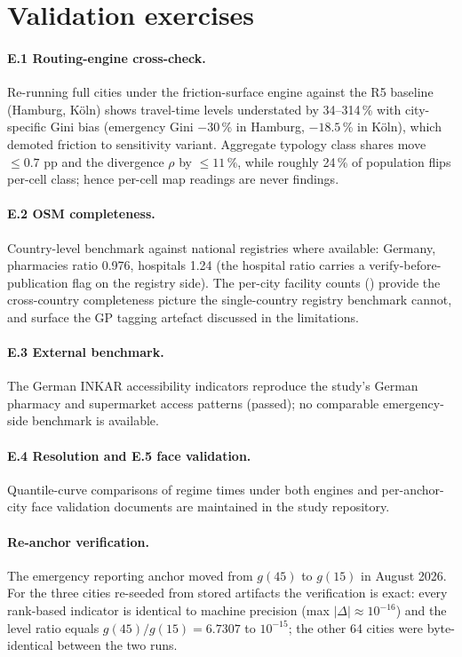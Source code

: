 \documentclass[11pt]{article}
\newcommand{\gref}{g(15)}          %
\begin{document}
\section{Validation exercises}\label{si:validation}

\paragraph{E.1 Routing-engine cross-check.} Re-running full cities under
the friction-surface engine against the R5 baseline (Hamburg, K\"oln)
shows travel-time levels understated by 34--314\,\% with city-specific
Gini bias (emergency Gini $-30$\,\% in Hamburg, $-18.5$\,\% in K\"oln),
which demoted friction to sensitivity variant. Aggregate typology class
shares move $\leq 0.7$ pp and the divergence $\rho$ by $\leq 11\,\%$,
while roughly 24\,\% of population flips per-cell class; hence per-cell
map readings are never findings.

\paragraph{E.2 OSM completeness.} Country-level benchmark against
national registries where available: Germany, pharmacies ratio 0.976,
hospitals 1.24 (the hospital ratio carries a verify-before-publication
flag on the registry side). The per-city facility counts
() provide the cross-country
completeness picture the single-country registry benchmark cannot, and
surface the GP tagging artefact discussed in the limitations.

\paragraph{E.3 External benchmark.} The German INKAR accessibility
indicators reproduce the study's German pharmacy and supermarket access
patterns (passed); no comparable emergency-side benchmark is available.

\paragraph{E.4 Resolution and E.5 face validation.} Quantile-curve
comparisons of regime times under both engines and per-anchor-city face
validation documents are maintained in the study repository.

\paragraph{Re-anchor verification.} The emergency reporting anchor moved
from $g(45)$ to $\gref$ in August 2026. For the three cities re-seeded
from stored artifacts the verification is exact: every rank-based
indicator is identical to machine precision (max $|\Delta| \approx
10^{-16}$) and the level ratio equals $g(45)/g(15) = 6.7307$ to
$10^{-15}$; the other 64 cities were byte-identical between the two
runs.
\end{document}
